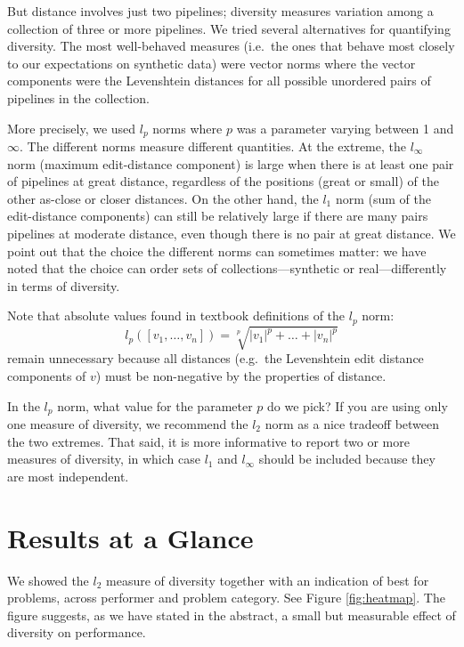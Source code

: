 \documentclass{article}
\begin{document}
But distance involves just two pipelines; diversity measures variation
among a collection of three or more pipelines.  We tried several
alternatives for quantifying diversity.  The most well-behaved
measures (i.e.\ the ones that behave most closely to our expectations
on synthetic data) were vector norms where the vector components were
the Levenshtein distances for all possible unordered pairs of
pipelines in the collection.

More precisely, we used $l_p$ norms where $p$ was a parameter varying
between 1 and $\infty$.  The different norms measure different
quantities.  At the extreme, the $l_\infty$ norm (maximum
edit-distance component) is large when there is at least one pair of
pipelines at great distance, regardless of the positions (great or
small) of the other as-close or closer distances.  On the other hand,
the $l_1$ norm (sum of the edit-distance components) can still be
relatively large if there are many pairs pipelines at moderate
distance, even though there is no pair at great distance.  We point
out that the choice the different norms can sometimes matter: we have
noted that the choice can order sets of collections---synthetic or
real---differently in terms of diversity.

Note that absolute values found in textbook definitions of the $l_p$
norm:
$$l_p([v_1,\dots,v_n]) = \sqrt[p]{|v_1|^p + \dots + |v_n|^p}$$ remain
unnecessary because all distances (e.g.\ the Levenshtein edit distance
components of $v$) must be non-negative by the properties of distance.

In the $l_p$ norm, what value for the parameter $p$ do we pick?  If
you are using only one measure of diversity, we recommend the $l_2$
norm as a nice tradeoff between the two extremes.  That said, it is
more informative to report two or more measures of diversity, in which
case $l_1$ and $l_\infty$ should be included because they are most
independent.

\section{Results at a Glance}
\label{sec:glance}
We showed the $l_2$ measure of diversity together with an indication
of best for problems, across performer and problem category.  See
Figure \ref{fig:heatmap}.  The figure suggests, as we have stated in
the abstract, a small but measurable effect of diversity on
performance.
\end{document}

